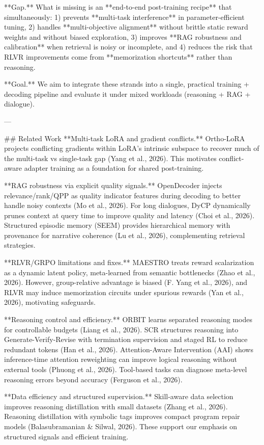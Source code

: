 **Gap.** What is missing is an **end-to-end post-training recipe** that simultaneously:  
1) prevents **multi-task interference** in parameter-efficient tuning,  
2) handles **multi-objective alignment** without brittle static reward weights and without biased exploration,  
3) improves **RAG robustness and calibration** when retrieval is noisy or incomplete, and  
4) reduces the risk that RLVR improvements come from **memorization shortcuts** rather than reasoning.

**Goal.** We aim to integrate these strands into a single, practical training + decoding pipeline and evaluate it under mixed workloads (reasoning + RAG + dialogue).

---

## Related Work  
**Multi-task LoRA and gradient conflicts.** Ortho-LoRA projects conflicting gradients within LoRA’s intrinsic subspace to recover much of the multi-task vs single-task gap (Yang et al., 2026). This motivates conflict-aware adapter training as a foundation for shared post-training.

**RAG robustness via explicit quality signals.** OpenDecoder injects relevance/rank/QPP as quality indicator features during decoding to better handle noisy contexts (Mo et al., 2026). For long dialogues, DyCP dynamically prunes context at query time to improve quality and latency (Choi et al., 2026). Structured episodic memory (SEEM) provides hierarchical memory with provenance for narrative coherence (Lu et al., 2026), complementing retrieval strategies.

**RLVR/GRPO limitations and fixes.** MAESTRO treats reward scalarization as a dynamic latent policy, meta-learned from semantic bottlenecks (Zhao et al., 2026). However, group-relative advantage is biased (F. Yang et al., 2026), and RLVR may induce memorization circuits under spurious rewards (Yan et al., 2026), motivating safeguards.

**Reasoning control and efficiency.** ORBIT learns separated reasoning modes for controllable budgets (Liang et al., 2026). SCR structures reasoning into Generate-Verify-Revise with termination supervision and staged RL to reduce redundant tokens (Han et al., 2026). Attention-Aware Intervention (AAI) shows inference-time attention reweighting can improve logical reasoning without external tools (Phuong et al., 2026). Tool-based tasks can diagnose meta-level reasoning errors beyond accuracy (Ferguson et al., 2026).

**Data efficiency and structured supervision.** Skill-aware data selection improves reasoning distillation with small datasets (Zhang et al., 2026). Reasoning distillation with symbolic tags improves compact program repair models (Balasubramanian & Silwal, 2026). These support our emphasis on structured signals and efficient training.

